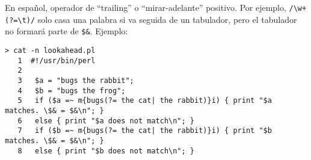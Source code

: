 \begin{it}
En español, operador de ``trailing'' o ``mirar-adelante'' positivo. 
Por ejemplo, \verb|/\w+(?=\t)/| solo casa una palabra si va seguida de un tabulador, pero el tabulador no formará parte de \verb|$&|.
Ejemplo:
\begin{latexonly}
\begin{verbatim}
> cat -n lookahead.pl
   1  #!/usr/bin/perl
   2  
   3   $a = "bugs the rabbit";
   4   $b = "bugs the frog";
   5   if ($a =~ m{bugs(?= the cat| the rabbit)}i) { print "$a matches. \$& = $&\n"; }
   6   else { print "$a does not match\n"; }
   7   if ($b =~ m{bugs(?= the cat| the rabbit)}i) { print "$b matches. \$& = $&\n"; }
   8   else { print "$b does not match\n"; }
\end{verbatim}
\end{latexonly}
\begin{verbatim}


\end{verbatim}
\end{it}
